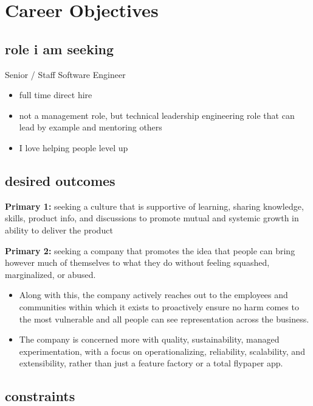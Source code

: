 \documentclass[
]{article}
\author{}
\date{}
\providecommand{\tightlist}{%
  \setlength{\itemsep}{0pt}\setlength{\parskip}{0pt}}
\begin{document}
\section{Career Objectives}\label{career-objectives}

\subsection{role i am seeking}\label{role-i-am-seeking}

Senior / Staff Software Engineer

\begin{itemize}
\tightlist
\item
  full time direct hire
\item
  not a management role, but technical leadership engineering role that
  can lead by example and mentoring others
\item
  I love helping people level up
\end{itemize}

\subsection{desired outcomes}\label{desired-outcomes}

\textbf{Primary 1:} seeking a culture that is supportive of learning,
sharing knowledge, skills, product info, and discussions to promote
mutual and systemic growth in ability to deliver the product

\textbf{Primary 2:} seeking a company that promotes the idea that people
can bring however much of themselves to what they do without feeling
squashed, marginalized, or abused.

\begin{itemize}
\item
  Along with this, the company actively reaches out to the employees and
  communities within which it exists to proactively ensure no harm comes
  to the most vulnerable and all people can see representation across
  the business.
\item
  The company is concerned more with quality, sustainability, managed
  experimentation, with a focus on operationalizing, reliability,
  scalability, and extensibility, rather than just a feature factory or
  a total flypaper app.
\end{itemize}

\subsection{constraints}\label{constraints}
\end{document}

